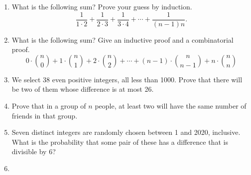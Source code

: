 \documentclass[11pt,letterpaper]{report}
\begin{document}
\begin{enumerate}
	\vfill\pagebreak

	\item What is the following sum? Prove your guess by induction.
	\[
	\frac{1}{1\cdot 2} + \frac{1}{2\cdot 3} + \frac{1}{3\cdot 4} + \cdots + \frac{1}{(n-1)n}.
	\]

	\vfill

	\item What is the following sum? Give an inductive proof and a combinatorial proof.
	\[
	0\cdot \binom{n}{0} + 1\cdot \binom{n}{1} + 2\cdot \binom{n}{2} + \cdots + (n-1)\cdot\binom{n}{n-1} + n\cdot \binom{n}{n}
	\]
	\vfill

	\item We select 38 even positive integers, all less than 1000. Prove that there will be two of them whose difference is at most 26.

	\vfill

	\item Prove that in a group of $n$ people, at least two will have the same number of friends in that group.

	\vfill

	\item Seven distinct integers are randomly chosen between 1 and 2020, inclusive. What is the probability that some pair of these has a difference that is divisible by 6?

	\vfill

	\item 

\end{enumerate}
\end{document}
